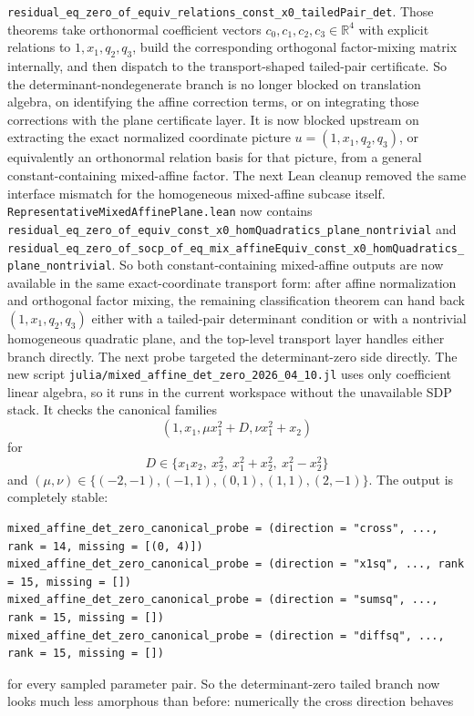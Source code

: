 \documentclass[11pt]{article}
\begin{document}
\texttt{residual\_eq\_zero\_of\_equiv\_relations\_const\_x0\_tailedPair\_det}.
Those theorems take orthonormal coefficient vectors
\(c_0,c_1,c_2,c_3 \in \mathbb{R}^4\) with explicit relations to
\(1,x_1,q_2,q_3\), build the corresponding orthogonal factor-mixing matrix
internally, and then dispatch to the transport-shaped tailed-pair certificate.
So the determinant-nondegenerate branch is no longer blocked on translation
algebra, on identifying the affine correction terms, or on integrating those
corrections with the plane certificate layer. It is now blocked upstream on
extracting the exact normalized coordinate picture \(u=(1,x_1,q_2,q_3)\), or
equivalently an orthonormal relation basis for that picture, from a general
constant-containing mixed-affine factor.
The next Lean cleanup removed the same interface mismatch for the homogeneous
mixed-affine subcase itself. \texttt{RepresentativeMixedAffinePlane.lean} now
contains
\texttt{residual\_eq\_zero\_of\_equiv\_const\_x0\_homQuadratics\_plane\_nontrivial}
and
\texttt{residual\_eq\_zero\_of\_socp\_of\_eq\_mix\_affineEquiv\_const\_x0\_homQuadratics\_plane\_nontrivial}.
So both constant-containing mixed-affine outputs are now available in the same
exact-coordinate transport form: after affine normalization and orthogonal
factor mixing, the remaining classification theorem can hand back
\((1,x_1,q_2,q_3)\) either with a tailed-pair determinant condition or with a
nontrivial homogeneous quadratic plane, and the top-level transport layer
handles either branch directly.
The next probe targeted the determinant-zero side directly. The new script
\texttt{julia/mixed\_affine\_det\_zero\_2026\_04\_10.jl} uses only coefficient
linear algebra, so it runs in the current workspace without the unavailable SDP
stack. It checks the canonical families
\[
  (1,x_1,\mu x_1^2 + D,\nu x_1^2 + x_2)
\]
for
\[
  D \in \{x_1x_2,\ x_2^2,\ x_1^2+x_2^2,\ x_1^2-x_2^2\}
\]
and \((\mu,\nu) \in
\{(-2,-1),(-1,1),(0,1),(1,1),(2,-1)\}\). The output is completely stable:
\begin{verbatim}
mixed_affine_det_zero_canonical_probe = (direction = "cross", ..., rank = 14, missing = [(0, 4)])
mixed_affine_det_zero_canonical_probe = (direction = "x1sq", ..., rank = 15, missing = [])
mixed_affine_det_zero_canonical_probe = (direction = "sumsq", ..., rank = 15, missing = [])
mixed_affine_det_zero_canonical_probe = (direction = "diffsq", ..., rank = 15, missing = [])
\end{verbatim}
for every sampled parameter pair. So the determinant-zero tailed branch now
looks much less amorphous than before: numerically the cross direction behaves
\end{document}
